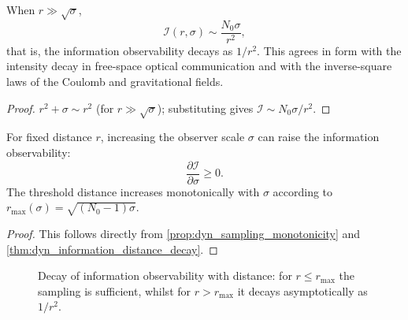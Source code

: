\begin{corollary}\label{cor:dyn_information_asymptotic}
When $r\gg\sqrt{\sigma}$,
\[
\mathcal I(r,\sigma)\sim \frac{N_0\sigma}{r^2},
\]
that is, the information observability decays as $1/r^2$. This agrees in form with the intensity decay in free-space optical communication and with the inverse-square laws of the Coulomb and gravitational fields.
\end{corollary}

\begin{proof}
$r^2+\sigma\sim r^2$ (for $r\gg\sqrt\sigma$); substituting gives $\mathcal I\sim N_0\sigma/r^2$.
\end{proof}

\begin{proposition}\label{prop:dyn_information_sigma_compensation}
For fixed distance $r$, increasing the observer scale $\sigma$ can raise the information observability:
\[
\frac{\partial \mathcal I}{\partial \sigma}\ge 0.
\]
The threshold distance increases monotonically with $\sigma$ according to $r_{\max}(\sigma)=\sqrt{(N_0-1)\sigma}$.
\end{proposition}

\begin{proof}
This follows directly from \cref{prop:dyn_sampling_monotonicity} and \cref{thm:dyn_information_distance_decay}.
\end{proof}

\begin{figure}[htbp]
\centering
{}
\caption{Decay of information observability with distance: for $r\le r_{\max}$ the sampling is sufficient, whilst for $r>r_{\max}$ it decays asymptotically as $1/r^2$.}
\label{fig:info_distance_decay}
\end{figure}

